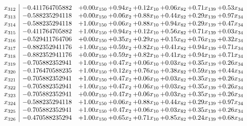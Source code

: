 \documentclass[8pt]{article}
\begin{document}
\[\begin{array}{c| c c@{\hskip 2pt} c@{\hskip 2pt} c@{\hskip 2pt} c@{\hskip 2pt} c@{\hskip 2pt} c@{\hskip 2pt} }
 x_{312}   &  -0.411764705882 & +  0.00 x_{150} & +  0.94 x_{2} & +  0.12 x_{10} & +  0.06 x_{82} & +  0.71 x_{139} & +  0.53 x_{34}\\
 x_{313}   &  -0.588235294118 & +  0.00 x_{150} & +  0.06 x_{2} & +  0.88 x_{10} & +  0.44 x_{82} & +  0.29 x_{139} & +  0.97 x_{34}\\
 x_{314}   &  -0.588235294118 & +  1.00 x_{150} & +  0.06 x_{2} & +  0.88 x_{10} & +  0.94 x_{82} & +  0.29 x_{139} & +  0.47 x_{34}\\
 x_{315}   &  -0.411764705882 & +  1.00 x_{150} & +  0.94 x_{2} & +  0.12 x_{10} & +  0.56 x_{82} & +  0.71 x_{139} & +  0.03 x_{34}\\
 x_{316}   &  -0.529411764706 & +  0.00 x_{150} & +  0.35 x_{2} & +  0.29 x_{10} & +  0.15 x_{82} & +  0.76 x_{139} & +  0.32 x_{34}\\
 x_{317}   &  -0.882352941176 & +  1.00 x_{150} & +  0.59 x_{2} & +  0.82 x_{10} & +  0.41 x_{82} & +  0.94 x_{139} & +  0.71 x_{34}\\
 x_{318}   &  -0.882352941176 & +  0.00 x_{150} & +  0.59 x_{2} & +  0.82 x_{10} & +  0.41 x_{82} & +  0.94 x_{139} & +  0.71 x_{34}\\
 x_{319}   &  -0.705882352941 & +  1.00 x_{150} & +  0.47 x_{2} & +  0.06 x_{10} & +  0.03 x_{82} & +  0.35 x_{139} & +  0.26 x_{34}\\
 x_{320}   &  -0.176470588235 & +  1.00 x_{150} & +  0.12 x_{2} & +  0.76 x_{10} & +  0.38 x_{82} & +  0.59 x_{139} & +  0.44 x_{34}\\
 x_{321}   &  -0.705882352941 & +  1.00 x_{150} & +  0.47 x_{2} & +  0.06 x_{10} & +  0.03 x_{82} & +  0.35 x_{139} & +  0.26 x_{34}\\
 x_{322}   &  -0.705882352941 & +  1.00 x_{150} & +  0.47 x_{2} & +  0.06 x_{10} & +  0.03 x_{82} & +  0.35 x_{139} & +  0.26 x_{34}\\
 x_{323}   &  -0.705882352941 & +  0.00 x_{150} & +  0.47 x_{2} & +  0.06 x_{10} & +  0.03 x_{82} & +  0.35 x_{139} & +  0.26 x_{34}\\
 x_{324}   &  -0.588235294118 & +  1.00 x_{150} & +  0.06 x_{2} & +  0.88 x_{10} & +  0.44 x_{82} & +  0.29 x_{139} & +  0.97 x_{34}\\
 x_{325}   &  -0.705882352941 & +  1.00 x_{150} & +  0.47 x_{2} & +  0.06 x_{10} & +  0.03 x_{82} & +  0.35 x_{139} & +  0.26 x_{34}\\
 x_{326}   &  -0.470588235294 & +  1.00 x_{150} & +  0.65 x_{2} & +  0.71 x_{10} & +  0.85 x_{82} & +  0.24 x_{139} & +  0.68 x_{34}\\

\end{array}\]
\end{document}
